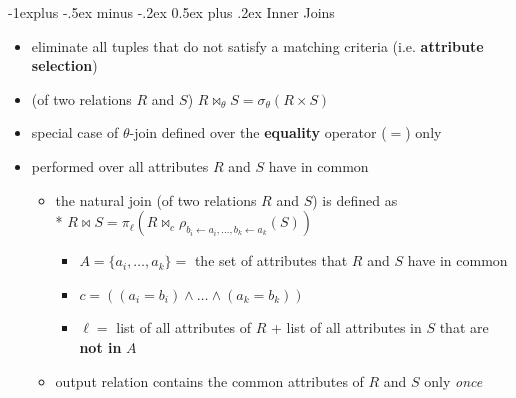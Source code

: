 \documentclass[10pt, landscape]{article}
\makeatletter
\renewcommand{\subsection}{\@startsection{subsection}{2}{0mm}%
  {-1explus -.5ex minus -.2ex}%
  {0.5ex plus .2ex}%
{\normalfont\normalsize\bfseries}}
\makeatother
\begin{document}
\begin{multicols}{4}
  \subsection{Inner Joins} 
  \begin{itemize}
    \item eliminate all tuples that do not satisfy a matching criteria (i.e. \textbf{attribute selection})
    \item {} (of two relations $R$ and $S$) \( {\displaystyle{R \bowtie_\theta S = \sigma_\theta(R \times S)}} \) 
    \item {} special case of $\theta$-join defined over the  \textbf{equality} operator ($=$) only
    \item {} performed over all attributes $R$ and $S$ have in common
      \begin{itemize}
        \item the natural join (of two relations $R$ and $S$) is defined as 
          \\* $R \Join S = \pi_\ell(R\Join_c \rho_{b_i \leftarrow a_i, \dots, b_k \leftarrow a_k}(S))$
          \begin{itemize}
            \item $A=\{a_i, \dots, a_k\} =$ the set of attributes that $R$ and $S$ have in common
            \item $c = ((a_i = b_i) \land \dots \land (a_k = b_k))$
            \item $\ell =$ list of all attributes of $R$ + list of all attributes in $S$ that are \textbf{not in}  $A$
          \end{itemize}
        \item output relation contains the common attributes of $R$ and $S$ only \textit{once} 
      \end{itemize}
  \end{itemize}


\end{multicols}
\end{document}
